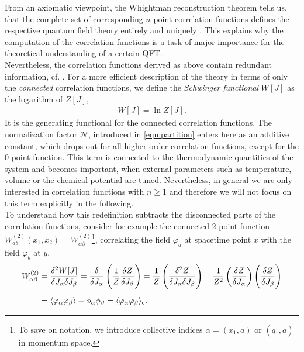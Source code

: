 From an axiomatic viewpoint, the Whightman reconstruction theorem tells us, that the complete set of corresponding $n$-point correlation functions defines the respective quantum field theory entirely and uniquely \cite{Wightman1956}. This explains why the computation of the correlation functions is a task of major importance for the theoretical understanding of a certain QFT. \\
Nevertheless, the correlation functions derived as above contain redundant information, cf. . For a more efficient description of the theory in terms of only the \textit{connected} correlation functions, we define the \textit{Schwinger functional} $W[J]$ as the logarithm of $Z[J]$,  
\begin{align}
W[J] = \ln Z[J].
\label{eqn:Schwinger}
\end{align}
It is the generating functional for the connected correlation functions. The normalization factor $\mathcal{N}$, introduced in \eqref{eqn:partition} enters here as an additive constant, which drops out for all higher order correlation functions, except for the 0-point function. This term is connected to the thermodynamic quantities of the system and becomes important, when external parameters such as temperature, volume or the chemical potential are tuned. Nevertheless, in general we are only interested in correlation functions with $n\geq 1$ and therefore we will not focus on this term explicitly in the following.\\
To understand how this redefinition subtracts the disconnected parts of the correlation functions, consider for example the connected 2-point function $W^{(2)}_{ab}(x_1,x_2) = W^{(2)}_{\alpha\beta}$\footnote{To save on notation, we introduce collective indices $\alpha = (x_1,a)$ or $(q_1,a)$ in momentum space.}, correlating the field $\varphi_a$ at spacetime point $x$ with the field $\varphi_b$ at $y$,
\begin{equation}
\begin{aligned}
	W^{(2)}_{\alpha\beta} &= \frac{\delta^2W[J]}{\delta J_{\alpha}\delta J_{\beta}} = \frac{\delta}{\delta J_{\alpha}}\left(\frac{1}{Z}\frac{\delta Z}{\delta J_{\beta}}\right) = \frac{1}{Z}\left(\frac{\delta^2Z}{\delta J_{\alpha}\delta J_{\beta}}\right) - \frac{1}{Z^2}\left(\frac{\delta Z}{\delta J_{\alpha}}\right)\left(\frac{\delta Z}{\delta J_{\beta}}\right)\\[0.5em]
				&= \langle \varphi_{\alpha}\varphi_{\beta} \rangle - \phi_{\alpha}\phi_{\beta} = \langle \varphi_{\alpha}\varphi_{\beta} \rangle_{\mathrm{c}}. 
\end{aligned}
\label{eqn:G_connected}						
\end{equation}
